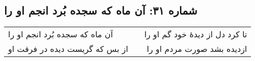 \begin{center}
\section*{شماره ۳۱: آن ماه که سجده بُرد انجم او را}
\label{sec:031}
\begin{longtable}{l p{0.5cm} r}
آن ماه که سجده بُرد انجم او را
&&
تا کرد دل از دیدهٔ خود گم او را
\\
از بس که گریست دیده در فرقت او
&&
ازدیده بشد صورت مردم او را
\\
\end{longtable}
\end{center}
